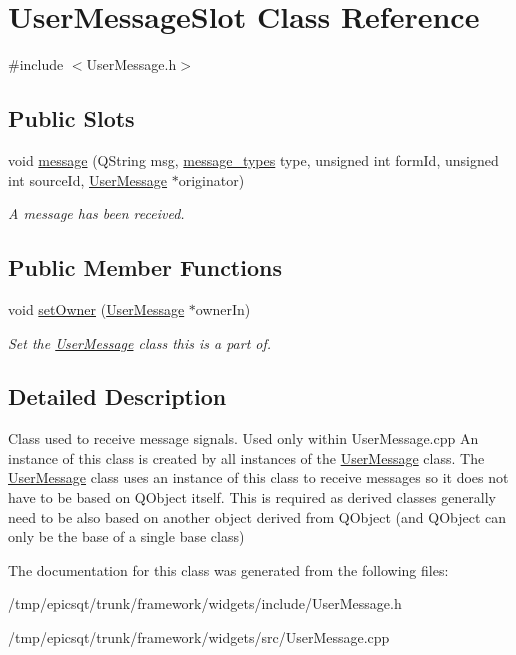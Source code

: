 \hypertarget{classUserMessageSlot}{
\section{UserMessageSlot Class Reference}
\label{classUserMessageSlot}
}


{\ttfamily \#include $<$UserMessage.h$>$}

\subsection*{Public Slots}
\begin{DoxyCompactItemize}
\item 
\hypertarget{classUserMessageSlot_ab050a1a0826289eb649cd7ed13b93729}{
void \hyperlink{classUserMessageSlot_ab050a1a0826289eb649cd7ed13b93729}{message} (QString msg, \hyperlink{classmessage__types}{message\_\-types} type, unsigned int formId, unsigned int sourceId, \hyperlink{classUserMessage}{UserMessage} $\ast$originator)}
\label{classUserMessageSlot_ab050a1a0826289eb649cd7ed13b93729}

\begin{DoxyCompactList}\small\item\em A message has been received. \end{DoxyCompactList}\end{DoxyCompactItemize}
\subsection*{Public Member Functions}
\begin{DoxyCompactItemize}
\item 
\hypertarget{classUserMessageSlot_aad910815d01791fd898d3bd66fbd2020}{
void \hyperlink{classUserMessageSlot_aad910815d01791fd898d3bd66fbd2020}{setOwner} (\hyperlink{classUserMessage}{UserMessage} $\ast$ownerIn)}
\label{classUserMessageSlot_aad910815d01791fd898d3bd66fbd2020}

\begin{DoxyCompactList}\small\item\em Set the \hyperlink{classUserMessage}{UserMessage} class this is a part of. \end{DoxyCompactList}\end{DoxyCompactItemize}


\subsection{Detailed Description}
Class used to receive message signals. Used only within UserMessage.cpp An instance of this class is created by all instances of the \hyperlink{classUserMessage}{UserMessage} class. The \hyperlink{classUserMessage}{UserMessage} class uses an instance of this class to receive messages so it does not have to be based on QObject itself. This is required as derived classes generally need to be also based on another object derived from QObject (and QObject can only be the base of a single base class) 

The documentation for this class was generated from the following files:\begin{DoxyCompactItemize}
\item 
/tmp/epicsqt/trunk/framework/widgets/include/UserMessage.h\item 
/tmp/epicsqt/trunk/framework/widgets/src/UserMessage.cpp\end{DoxyCompactItemize}
